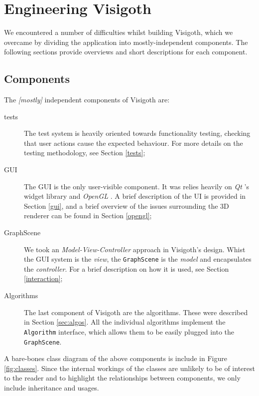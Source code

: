 \documentclass[a4paper,11pt,titlepage]{article}
\let\stdsection\section         %
\renewcommand{\section}{\newpage\stdsection}
\newcommand{\code}[1]{\texttt{#1}}
\newcommand{\buzz}[1]{\emph{#1}}
\newcommand{\Qt}{\buzz{Qt} }
\newcommand{\OpenGL}{\buzz{OpenGL} }
\begin{document}
\section{Engineering Visigoth}

We encountered a number of difficulties whilst building Visigoth,
which we overcame by dividing the application into mostly-independent
components. The following sections provide overviews and short
descriptions for each component.

\subsection{Components}
\label{components}

The \emph{[mostly]} independent components of Visigoth are:
\begin{description}
  \item [tests] The test system is heavily oriented towards
    functionality testing, checking that user actions cause the
    expected behaviour. For more details on the testing methodology,
    see Section \ref{tests};

  \item [GUI] The GUI is the only user-visible component. It was
    relies heavily on \Qt's widget library and \OpenGL. A brief
    description of the UI is provided in Section \ref{gui}, and a
    brief overview of the issues surrounding the 3D renderer can be
    found in Section \ref{opengl};

  \item [GraphScene] We took an \buzz{Model-View-Controller} approach
    in Visigoth's design. Whist the GUI system is the \buzz{view}, the
    \code{GraphScene} is the \buzz{model} and encapsulates the
    \buzz{controller}. For a brief description on how it is used, see
    Section \ref{interaction};

  \item [Algorithms] The last component of Visigoth are the algorithms. These
    were described in Section \ref{sec:algos}. All the individual algorithms
    implement the \code{Algorithm} interface, which allows them to be easily
    plugged into the \code{GraphScene}.
\end{description}

A bare-bones class diagram of the above components is include in
Figure \ref{fig:classes}. Since the internal workings of the classes
are unlikely to be of interest to the reader and to highlight the
relationships between components, we only include inheritance and
usages.
\end{document}
